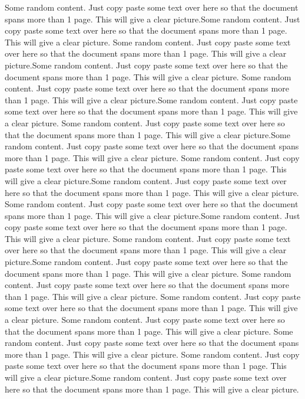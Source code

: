 \documentclass{article}
\begin{document}
	Some random content. Just copy paste some text over here so that the document spans more than 1 page. This will give a clear picture.Some random content. Just copy paste some text over here so that the document spans more than 1 page. This will give a clear picture.
	Some random content. Just copy paste some text over here so that the document spans more than 1 page. This will give a clear picture.Some random content. Just copy paste some text over here so that the document spans more than 1 page. This will give a clear picture.
	Some random content. Just copy paste some text over here so that the document spans more than 1 page. This will give a clear picture.Some random content. Just copy paste some text over here so that the document spans more than 1 page. This will give a clear picture.
	Some random content. Just copy paste some text over here so that the document spans more than 1 page. This will give a clear picture.Some random content. Just copy paste some text over here so that the document spans more than 1 page. This will give a clear picture.
	Some random content. Just copy paste some text over here so that the document spans more than 1 page. This will give a clear picture.Some random content. Just copy paste some text over here so that the document spans more than 1 page. This will give a clear picture.
	Some random content. Just copy paste some text over here so that the document spans more than 1 page. This will give a clear picture.Some random content. Just copy paste some text over here so that the document spans more than 1 page. This will give a clear picture.
	Some random content. Just copy paste some text over here so that the document spans more than 1 page. This will give a clear picture.Some random content. Just copy paste some text over here so that the document spans more than 1 page. This will give a clear picture.
	Some random content. Just copy paste some text over here so that the document spans more than 1 page. This will give a clear picture.
	Some random content. Just copy paste some text over here so that the document spans more than 1 page. This will give a clear picture.
	Some random content. Just copy paste some text over here so that the document spans more than 1 page. This will give a clear picture.
	Some random content. Just copy paste some text over here so that the document spans more than 1 page. This will give a clear picture.
	Some random content. Just copy paste some text over here so that the document spans more than 1 page. This will give a clear picture.Some random content. Just copy paste some text over here so that the document spans more than 1 page. This will give a clear picture.
\end{document}
